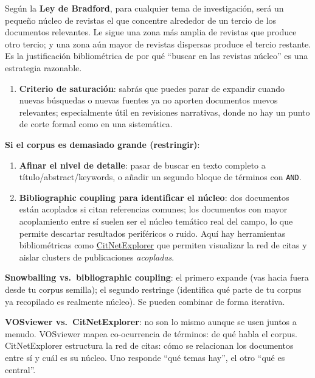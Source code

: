 \documentclass[
]{book}
\providecommand{\tightlist}{%
  \setlength{\itemsep}{0pt}\setlength{\parskip}{0pt}}
\begin{document}
Según la \textbf{Ley de Bradford}, para cualquier tema de investigación, será un pequeño núcleo de revistas el que concentre alrededor de un tercio de los documentos relevantes. Le sigue una zona más amplia de revistas que produce otro tercio; y una zona aún mayor de revistas dispersas produce el tercio restante. Es la justificación bibliométrica de por qué ``buscar en las revistas núcleo'' es una estrategia razonable.

\begin{enumerate}
\def\labelenumi{\arabic{enumi}.}
\setcounter{enumi}{4}
\tightlist
\item
  \textbf{Criterio de saturación}: sabrás que puedes parar de expandir cuando nuevas búsquedas o nuevas fuentes ya no aporten documentos nuevos relevantes; especialmente útil en revisiones narrativas, donde no hay un punto de corte formal como en una sistemática.
\end{enumerate}

\textbf{Si el corpus es demasiado grande (restringir)}:

\begin{enumerate}
\def\labelenumi{\arabic{enumi}.}
\item
  \textbf{Afinar el nivel de detalle}: pasar de buscar en texto completo a título/abstract/keywords, o añadir un segundo bloque de términos con \texttt{AND}.
\item
  \textbf{Bibliographic coupling para identificar el núcleo}: dos documentos están acoplados si citan referencias comunes; los documentos con mayor acoplamiento entre sí suelen ser el núcleo temático real del campo, lo que permite descartar resultados periféricos o ruido. Aquí hay herramientas bibliométricas como \href{https://www.citnetexplorer.nl}{CitNetExplorer} que permiten visualizar la red de citas y aislar clusters de publicaciones \emph{acopladas}.
\end{enumerate}

\textbf{Snowballing vs.~bibliographic coupling}: el primero expande (vas hacia fuera desde tu corpus semilla); el segundo restringe (identifica qué parte de tu corpus ya recopilado es realmente núcleo). Se pueden combinar de forma iterativa.

\textbf{VOSviewer vs.~CitNetExplorer}: no son lo mismo aunque se usen juntos a menudo. VOSviewer mapea co-ocurrencia de términos: de qué habla el corpus. CitNetExplorer estructura la red de citas: cómo se relacionan los documentos entre sí y cuál es su núcleo. Uno responde ``qué temas hay'', el otro ``qué es central''.
\end{document}

